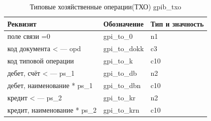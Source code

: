 

\begin{table}[!htbp]
    \centering
    \scriptsize
    \caption{Типовые хозяйственные операции(ТХО) gpib\_txo}
    \begin{tabular}{|l|l|l|} 

                                                                                       \hline
\textbf{Реквизит}               &\textbf{Обозначение}   &\textbf{Тип и значность}   \\ \hline
поле связи =0                   &gpi\_to\_0             &n1                         \\ \hline
код документа < --- opd         &gpi\_to\_dokk          &c3                         \\ \hline
код типовой операции            &gpi\_to\_k             &c10                        \\ \hline
дебет, счёт < --- ps\_1         &gpi\_to\_db            &n2                         \\ \hline
дебет, наименование * ps\_1     &gpi\_to\_dbn           &c10                        \\ \hline
кредит < --- ps\_2              &gpi\_to\_kr            &n2                         \\ \hline
кредит, наименование * ps\_2    &gpi\_to\_krn           &c10                        \\ \hline

    \end{tabular}
\end{table}

